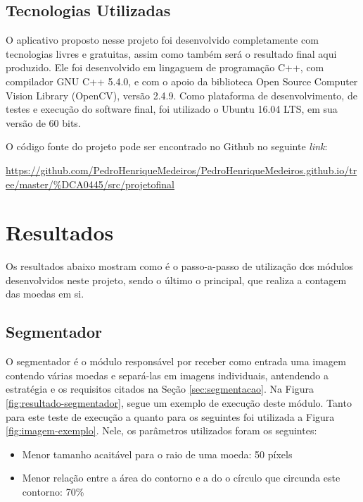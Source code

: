 \documentclass[10pt,journal,compsoc]{IEEEtran}
\begin{document}
\subsection{Tecnologias Utilizadas}
\label{sec:tecnologias-envolvidas}

O aplicativo proposto nesse projeto foi desenvolvido completamente com tecnologias livres e gratuitas, assim como também será o resultado final aqui produzido. Ele foi desenvolvido em lingaguem de programação C++, com compilador GNU C++ 5.4.0, e com o apoio da biblioteca Open Source Computer Vision Library (OpenCV), versão 2.4.9. Como plataforma de desenvolvimento, de testes e execução do software final, foi utilizado o Ubuntu 16.04 LTS, em sua versão de 60 bits.

O código fonte do projeto pode ser encontrado no Github no seguinte \textit{link}:

\url{https://github.com/PedroHenriqueMedeiros/PedroHenriqueMedeiros.github.io/tree/master/%DCA0445/src/projetofinal}

\section{Resultados}
\label{sec:resultados}

Os resultados  abaixo mostram como é o passo-a-passo de utilização dos módulos desenvolvidos neste projeto, sendo o último o principal, que realiza a contagem das moedas em si. 

\subsection{Segmentador}
\label{sec:segmentador}

O segmentador é o módulo responsável por receber como entrada uma imagem contendo várias moedas e separá-las em imagens individuais, antendendo a estratégia e os requisitos citados na Seção \ref{sec:segmentacao}. Na Figura \ref{fig:resultado-segmentador}, segue um exemplo de execução deste módulo. Tanto para este teste de execução a quanto para os seguintes foi utilizada a Figura \ref{fig:imagem-exemplo}. Nele, os parâmetros utilizados foram os seguintes:

\begin{itemize}  
\item Menor tamanho acaitável para o raio de uma moeda: 50 píxels
\item Menor relação entre a área do contorno e a do o círculo que circunda este contorno: 70\%
\end{itemize}
\end{document}
